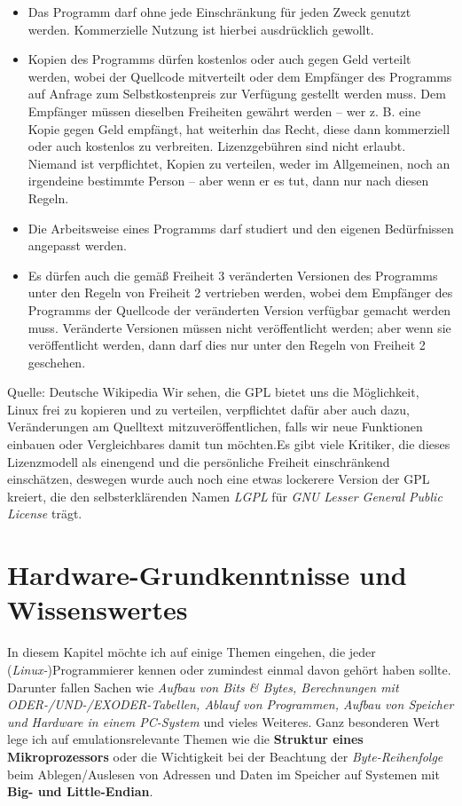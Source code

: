 \documentclass[b5paper,10pt,dvips,fleqn,titlepage,twoside]{book}
\begin{document}
\begin{itemize}
 \item Das Programm darf ohne jede Einschränkung für jeden Zweck genutzt werden. Kommerzielle Nutzung ist hierbei ausdrücklich gewollt.
\item Kopien des Programms dürfen kostenlos oder auch gegen Geld verteilt werden, wobei der Quellcode mitverteilt oder dem Empfänger des Programms auf Anfrage zum Selbstkostenpreis zur Verfügung gestellt werden muss. Dem Empfänger müssen dieselben Freiheiten gewährt werden – wer z. B. eine Kopie gegen Geld empfängt, hat weiterhin das Recht, diese dann kommerziell oder auch kostenlos zu verbreiten. Lizenzgebühren sind nicht erlaubt. Niemand ist verpflichtet, Kopien zu verteilen, weder im Allgemeinen, noch an irgendeine bestimmte Person – aber wenn er es tut, dann nur nach diesen Regeln.
\item  Die Arbeitsweise eines Programms darf studiert und den eigenen Bedürfnissen angepasst werden.
\item  Es dürfen auch die gemäß Freiheit 3 veränderten Versionen des Programms unter den Regeln von Freiheit 2 vertrieben werden, wobei dem Empfänger des Programms der Quellcode der veränderten Version verfügbar gemacht werden muss. Veränderte Versionen müssen nicht veröffentlicht werden; aber wenn sie veröffentlicht werden, dann darf dies nur unter den Regeln von Freiheit 2 geschehen.
\end{itemize}
Quelle: Deutsche Wikipedia 
\newpage
Wir sehen, die GPL bietet uns die Möglichkeit, Linux frei zu kopieren und zu verteilen, verpflichtet dafür aber auch dazu, Veränderungen am Quelltext mitzuveröffentlichen, falls wir neue Funktionen einbauen oder Vergleichbares damit tun möchten.\newline Es gibt viele Kritiker, die dieses Lizenzmodell als einengend und die persönliche Freiheit einschränkend einschätzen, deswegen wurde auch noch eine etwas lockerere Version der GPL kreiert, die den selbsterklärenden Namen \emph{LGPL} für \textit{GNU Lesser General Public License} trägt.
\newpage

\chapter{Hardware-Grundkenntnisse und Wissenswertes}
In diesem Kapitel möchte ich auf einige Themen eingehen, die jeder (\emph{Linux-})Programmierer kennen oder zumindest einmal davon gehört haben sollte. Darunter fallen Sachen wie \emph{Aufbau von Bits \& Bytes, Berechnungen mit ODER-/UND-/EXODER-Tabellen, Ablauf von Programmen, Aufbau von Speicher und Hardware in einem PC-System} und vieles Weiteres. Ganz besonderen Wert lege ich auf emulationsrelevante Themen wie die \textbf{Struktur eines Mikroprozessors} oder die Wichtigkeit bei der Beachtung der \emph{Byte-Reihenfolge} beim Ablegen/Auslesen von Adressen und Daten im Speicher auf Systemen mit \textbf{Big- und Little-Endian}.
\end{document}
